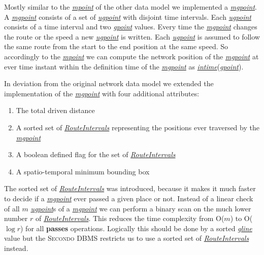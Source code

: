 \documentclass[a4paper]{article}
\newcommand{\secondo}{\textsc{Secondo}}
\newcommand{\op}[1]{\textbf{#1}}
\newcommand{\dt}[1]{\textsl{\underline{#1}}}
\begin{document}
{Mostly similar to the \dt{mpoint} of the other data model we implemented a
\dt{mgpoint}. A \dt{mgpoint} consists of a set of \dt{ugpoint} with disjoint
time intervals. Each \dt{ugpoint} consists of a time interval and two \dt{gpoint}
 values. Every time the \dt{mgpoint} changes the route or the speed a new
\dt{ugpoint} is written. Each \dt{ugpoint} is assumed to follow the same route
from the start to the end position at the same speed. So accordingly to the
\dt{mpoint} we can compute the network position of the \dt{mgpoint} at ever time
instant within the definition time of the \dt{mgpoint} as \dt{intime}(\dt{gpoint}).

In deviation from the original network data model we extended the implementation of the \dt{mgpoint} with four additional attributes:
\begin{enumerate}
	\item The total driven distance
	\item A sorted set of \dt{RouteIntervals} representing the positions ever
traversed by the \dt{mgpoint}
	\item A boolean defined flag for the set of \dt{RouteIntervals}
	\item A spatio-temporal minimum bounding box
\end{enumerate}
The sorted set of \dt{RouteIntervals} was introduced, because it makes it much
faster to decide if a \dt{mgpoint} ever passed a given place or not. Instead of
 a linear check of all $m$ \dt{ugpoint}s of a \dt{mgpoint} we can perform a
binary scan on the much lower number $r$ of \dt{RouteIntervals}. This reduces
the time complexity from O($m$) to O($\log r$) for all \op{passes}
operations. Logically this should be done by a sorted \dt{gline} value but the
\secondo{} DBMS restricts us to use a sorted set of \dt{RouteIntervals} instead.

}
\end{document}

